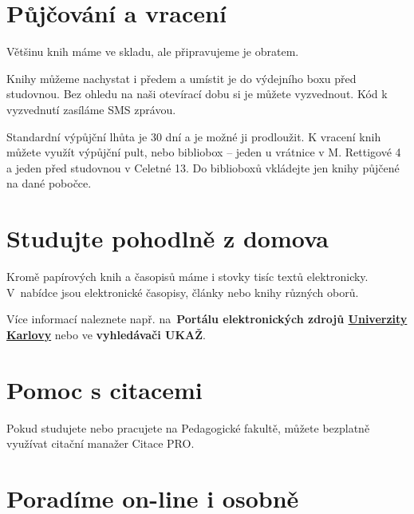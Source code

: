 \vspace{-1em}
\ikonka{\faBook}
\section{Půjčování a vracení }

Většinu knih máme ve skladu, ale připravujeme je obratem.

Knihy můžeme nachystat i předem a umístit je do výdejního boxu před studovnou.
Bez ohledu na naši otevírací dobu si je můžete vyzvednout. Kód k vyzvednutí
zasíláme SMS zprávou.

Standardní výpůjční lhůta je 30 dní a je možné ji prodloužit. 
K vracení knih
můžete využít výpůjční pult, nebo bibliobox -- jeden u vrátnice v M. Rettigové 4 a jeden před
studovnou v Celetné 13. Do biblioboxů vkládejte jen knihy půjčené na dané pobočce.




\ikonka{\faBed}
\section{Studujte pohodlně z domova}
Kromě papírových knih a časopisů máme i
stovky tisíc textů elektronicky.  V~nabídce jsou elektronické
časopisy, články nebo knihy různých oborů. 

Více informací naleznete např. na~\textbf{Portálu elektronických zdrojů
  {\href{https://ezdroje.cuni.cz}{Univerzity Karlovy}}} nebo ve \textbf{vyhledávači UKAŽ}.

\ikonka{\faAndroid}
\section{Pomoc s citacemi}

Pokud studujete nebo pracujete na Pedagogické fakultě, můžete bezplatně
využívat citační manažer Citace PRO. 




\ikonka{\faInfoCircle}
\section{Poradíme on-line i osobně} 

